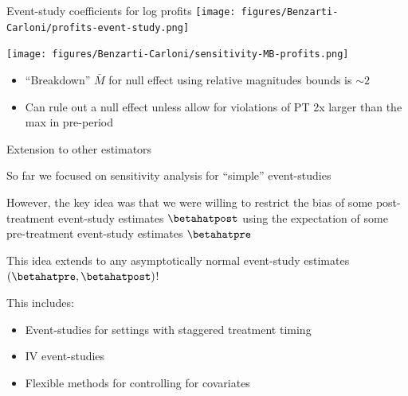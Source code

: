 \documentclass[aspectratio = 169, 13pt]{beamer}
\begin{document}
\begin{frame}{Event-study coefficients for log profits}
	\centering
	\texttt{[image: figures/Benzarti-Carloni/profits-event-study.png]}
\end{frame}

\begin{frame}
	{\centering
		\texttt{[image: figures/Benzarti-Carloni/sensitivity-MB-profits.png]}
	}
	
	\begin{itemize}
		\item
		      ``Breakdown'' $\bar{M}$ for null effect using relative magnitudes bounds is $\sim 2$
		          
		\item
		      Can rule out a null effect unless allow for violations of PT 2x larger than the max in pre-period
		      
	\end{itemize}
	
\end{frame}

\begin{frame}{Extension to other estimators}
	\begin{wideitemize}
		\item
		So far we focused on sensitivity analysis for ``simple'' event-studies
		
		\item
		However, the key idea was that we were willing to restrict the bias of some post-treatment event-study estimates $\betahatpost$ using the expectation of some pre-treatment event-study estimates $\betahatpre$
		
		\item
		This idea extends to any asymptotically normal event-study estimates $(\betahatpre, \betahatpost)$!
		
		\item
		This includes:
		
		\begin{itemize}
			\item
			Event-studies for settings with staggered treatment timing \citep[e.g.][]{callaway_difference--differences_2020, sun_estimating_2020}
			
			\item
			IV event-studies \citep[][]{hudson_interpreting_2017}
			
			\item
			Flexible methods for controlling for covariates \citep{santanna_doubly_2020}
		\end{itemize}
	\end{wideitemize}
\end{frame}
\end{document}
